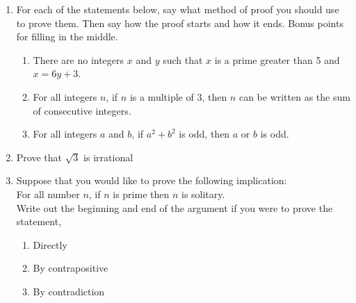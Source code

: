 \documentclass[11pt,a4paper]{article}
\newcommand\setItemNumber[1]{\setcounter{enumi}{\numexpr#1-1\relax}}
\begin{document}
\begin{enumerate}
\begin{enumerate}
            \end{enumerate}


        \item For each of the statements below, say what method of proof you should use to prove them. Then say how the proof starts and how it ends. Bonus points for filling in the middle.
            \begin{enumerate}
                \item There are no integers $x$ and $y$ such that $x$ is a prime greater than 5 and $x = 6y + 3$.
                \item For all integers $n$, if $n$ is a multiple of 3, then $n$ can be written as the sum of consecutive integers.
                \item For all integers $a$ and $b$, if $a^2 + b^2$ is odd, then $a$ or $b$ is odd.
            \end{enumerate}

        \setItemNumber{6}
        \item Prove that $\sqrt{3}$ is irrational

        \setItemNumber{10}
        \item Suppose that you would like to prove the following implication:\\
            For all number $n$, if $n$ is prime then $n$ is solitary.\\
            Write out the beginning and end of the argument if you were to prove the statement,\\
            \begin{enumerate}
                \item Directly
                \item By contrapositive
                \item By contradiction
            \end{enumerate}

        \end{enumerate}
\end{document}
